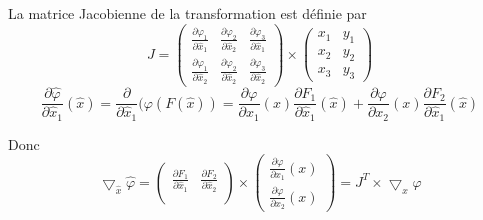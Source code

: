 \documentclass[a4paper,12pt,titlepage]{report}
\begin{document}
\begin{onehalfspace}
\begin{appendix}
La matrice Jacobienne de la transformation est définie par
\[	
J =
\begin{pmatrix}
  \frac{\partial\varphi_{1}}{\partial \hat{x}_{1}} & \frac{\partial\varphi_{2}}{\partial \hat{x}_{2}}  & \frac{\partial\varphi_{3}}{\partial \hat{x}_{1}}\\ 
  \frac{\partial\varphi_{1}}{\partial \hat{x}_{2}} & \frac{\partial \varphi_{2}}{\partial \hat{x}_{2}} & \frac{\partial\varphi_{3}}{\partial \hat{x}_{2}} 
\end{pmatrix} 
\times
\begin{pmatrix}
   x_{1} &  y_{1} \\
   x_{2} &  y_{2} \\
   x_{3} &  y_{3}
\end{pmatrix}
\]
\[
\frac{\partial \hat{\varphi}}{\partial \hat{x}_{1}}(\hat{x}) = 
\frac{\partial}{\partial \hat{x}_{1}}(\varphi(F(\hat{x})) = 
\frac{\partial \varphi}{\partial x_{1}}(x) \frac{\partial F_{1}}{\partial \hat{x}_{1}}(\hat{x}) +
\frac{\partial \varphi}{\partial x_{2}}(x) \frac{\partial F_{2}}{\partial \hat{x}_{1}}(\hat{x})
\]

Donc
\[ \bigtriangledown_{\hat{x}} \hat{\varphi} = 
\begin{pmatrix}
   \frac{\partial F_{1}}{\partial \hat{x}_{1}} & \frac{\partial F_{2}}{\partial \hat{x}_{2}}\\
\end{pmatrix}
\times 
\begin{pmatrix}
   \frac{\partial \varphi}{\partial x_{1}}(x) \\
   \frac{\partial\varphi}{\partial x_{2}}(x)
\end{pmatrix} = 
J^{T} \times \bigtriangledown_{x} \varphi \]


\end{appendix}
\end{onehalfspace}
\end{document}
